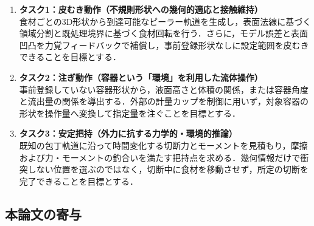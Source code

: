 \begin{revisionblock}
\begin{enumerate}
    \item \textbf{タスク1：皮むき動作（不規則形状への幾何的適応と接触維持）} \\
    食材ごとの3D形状から到達可能なピーラー軌道を生成し，表面法線に基づく領域分割と既処理境界に基づく食材回転を行う．さらに，モデル誤差と表面凹凸を力覚フィードバックで補償し，事前登録形状なしに設定範囲を皮むきできることを目標とする．
    
    \item \textbf{タスク2：注ぎ動作（容器という「環境」を利用した流体操作）} \\
    事前登録していない容器形状から，液面高さと体積の関係，または容器角度と流出量の関係を導出する．外部の計量カップを制御に用いず，対象容器の形状を操作量へ変換して指定量を注ぐことを目標とする．
    
    \item \textbf{タスク3：安定把持（外力に抗する力学的・環境的推論）} \\
    既知の包丁軌道に沿って時間変化する切断力とモーメントを見積もり，摩擦および力・モーメントの釣合いを満たす把持点を求める．幾何情報だけで衝突しない位置を選ぶのではなく，切断中に食材を移動させず，所定の切断を完了できることを目標とする．
\end{enumerate}
\end{revisionblock}

\subsection{本論文の寄与}

